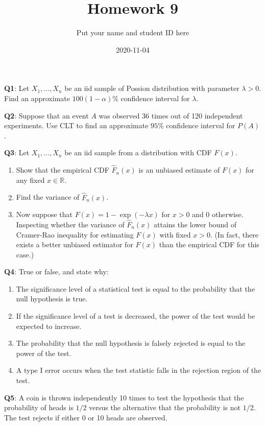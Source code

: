 \documentclass[]{article}
\title{Homework 9}
\author{Put your name and student ID here}
\date{2020-11-04}
\providecommand{\tightlist}{%
  \setlength{\itemsep}{0pt}\setlength{\parskip}{0pt}}
\begin{document}
\maketitle

\textbf{Q1}: Let \(X_1,\dots,X_n\) be an iid sample of Possion
distribution with parameter \(\lambda>0\). Find an approximate
\(100(1-\alpha)\%\) confidence interval for \(\lambda\).

\textbf{Q2}: Suppose that an event \(A\) was observed 36 times out of
120 independent experiments. Use CLT to find an approximate \(95\%\)
confidence interval for \(P(A)\).

\textbf{Q3}: Let \(X_1,\dots,X_n\) be an iid sample from a distribution
with CDF \(F(x)\).

\begin{enumerate}
\def\labelenumi{(\alph{enumi})}
\item
  Show that the empirical CDF \(\hat F_n(x)\) is an unbiased estimate of
  \(F(x)\) for any fixed \(x\in\mathbb{R}\).
\item
  Find the variance of \(\hat F_n(x)\).
\item
  Now suppose that \(F(x)=1-\exp(-\lambda x)\) for \(x>0\) and \(0\)
  otherwise. Inspecting whether the variance of \(\hat F_n(x)\) attains
  the lower bound of Cramer-Rao inequality for estimating \(F(x)\) with
  fixed \(x>0\). (In fact, there exists a better unbiased estimator for
  \(F(x)\) than the empirical CDF for this case.)
\end{enumerate}

\textbf{Q4}: True or false, and state why:

\begin{enumerate}
\def\labelenumi{\arabic{enumi}.}
\tightlist
\item
  The significance level of a statistical test is equal to the
  probability that the null hypothesis is true.
\item
  If the significance level of a test is decreased, the power of the
  test would be expected to increase.
\item
  The probability that the null hypothesis is falsely rejected is equal
  to the power of the test.
\item
  A type I error occurs when the test statistic falls in the rejection
  region of the test.
\end{enumerate}

\textbf{Q5}: A coin is thrown independently 10 times to test the
hypothesis that the probability of heads is \(1/2\) versus the
alternative that the probability is not \(1/2\). The test rejects if
either 0 or 10 heads are observed.
\end{document}
